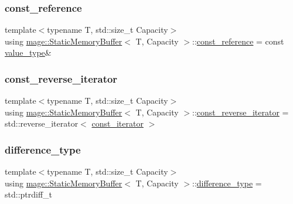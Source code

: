 \subsubsection{\texorpdfstring{const\+\_\+reference}{const\_reference}}
{\footnotesize\ttfamily template$<$typename T, std\+::size\+\_\+t Capacity$>$ \\
using \mbox{\hyperlink{classmage_1_1_static_memory_buffer}{mage\+::\+Static\+Memory\+Buffer}}$<$ T, Capacity $>$\+::\mbox{\hyperlink{classmage_1_1_static_memory_buffer_a2d961d7baf56ebc96e1e48579bcdcb84}{const\+\_\+reference}} =  const \mbox{\hyperlink{classmage_1_1_static_memory_buffer_a30a2fd97f8f458d752581dd69e717a97}{value\+\_\+type}}\&}

\mbox{\label{classmage_1_1_static_memory_buffer_afcde56a284e78597f2b331fc9bf379e8}} 
\subsubsection{\texorpdfstring{const\+\_\+reverse\+\_\+iterator}{const\_reverse\_iterator}}
{\footnotesize\ttfamily template$<$typename T, std\+::size\+\_\+t Capacity$>$ \\
using \mbox{\hyperlink{classmage_1_1_static_memory_buffer}{mage\+::\+Static\+Memory\+Buffer}}$<$ T, Capacity $>$\+::\mbox{\hyperlink{classmage_1_1_static_memory_buffer_afcde56a284e78597f2b331fc9bf379e8}{const\+\_\+reverse\+\_\+iterator}} =  std\+::reverse\+\_\+iterator$<$ \mbox{\hyperlink{classmage_1_1_static_memory_buffer_aa871d2967d2e9f4219ab47c16563e328}{const\+\_\+iterator}} $>$}

\mbox{\label{classmage_1_1_static_memory_buffer_a197f54439c47c9d72d1b6b181195a0fe}} 
\subsubsection{\texorpdfstring{difference\+\_\+type}{difference\_type}}
{\footnotesize\ttfamily template$<$typename T, std\+::size\+\_\+t Capacity$>$ \\
using \mbox{\hyperlink{classmage_1_1_static_memory_buffer}{mage\+::\+Static\+Memory\+Buffer}}$<$ T, Capacity $>$\+::\mbox{\hyperlink{classmage_1_1_static_memory_buffer_a197f54439c47c9d72d1b6b181195a0fe}{difference\+\_\+type}} =  std\+::ptrdiff\+\_\+t}

